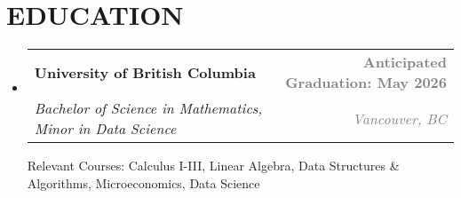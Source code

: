 \documentclass[letterpaper,11pt]{article}
\makeatletter
\newcommand{\resumeSubheading}[4]{
  \vspace{-2pt}\item
    \begin{tabular*}{1.0\textwidth}[t]{l@{\extracolsep{\fill}}r}
      \textbf{#1} & \textbf{\small \textcolor{gray}{#2}} \\
      \textit{\small#3} & \textit{\small {\textcolor{gray}{#4}}} \\
    \end{tabular*}\vspace{-7pt}
}
\newcommand{\resumeSubHeadingListStart}{\begin{itemize}[leftmargin=0.0in, label={}]}
\newcommand{\resumeSubHeadingListEnd}{\end{itemize}}
\makeatother
\begin{document}

\section{EDUCATION}
  \resumeSubHeadingListStart


    \resumeSubheading
      {University of British Columbia}{Anticipated Graduation: May 2026}
      {Bachelor of Science in Mathematics, Minor in Data Science}{Vancouver, BC}

      \vspace{0pt}
       {\small Relevant Courses: Calculus I-III, Linear Algebra, Data Structures \& Algorithms, Microeconomics, Data Science}
  \resumeSubHeadingListEnd


\end{document}
